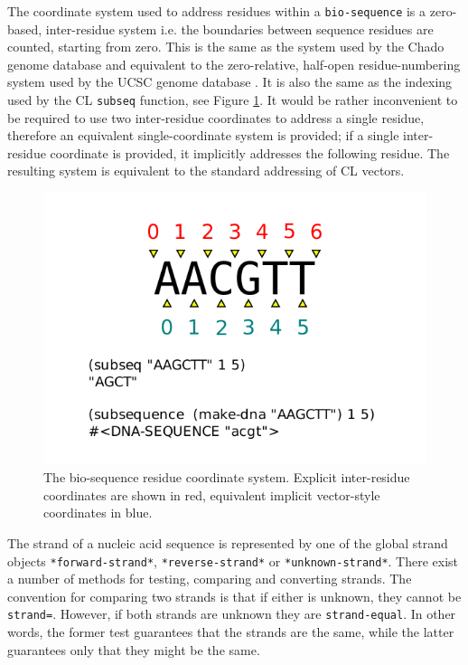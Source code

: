 \documentclass[a4paper, 12pt]{article}
\begin{document}
The coordinate system used to address residues within a
\lstinline!bio-sequence! is a zero-based, inter-residue system
i.e. the boundaries between sequence residues are counted, starting
from zero. This is the same as the system used by the Chado genome
database \cite{gmod-chado} and equivalent to the zero-relative,
half-open residue-numbering system used by the UCSC genome database
\cite{PMID:18996895}. It is also the same as the indexing used by the
CL \lstinline!subseq! function, see Figure
\ref{fig:inter-residue-coords}. It would be rather inconvenient
to be required to use two inter-residue coordinates to address a
single residue, therefore an equivalent single-coordinate system is
provided; if a single inter-residue coordinate is provided, it
implicitly addresses the following residue. The resulting system is
equivalent to the standard addressing of CL vectors.

\begin{figure}[tbph]
  \begin{center}
    \includegraphics[scale=1.0]{inter-residue-coordinates.pdf}
  \end{center}
  \caption{The bio-sequence residue coordinate system. Explicit
    inter-residue coordinates are shown in red, equivalent implicit
    vector-style coordinates in blue.}
  \label{fig:inter-residue-coords}
\end{figure}

The strand of a nucleic acid sequence is represented by one of the
global strand objects \lstinline!*forward-strand*!,
\lstinline!*reverse-strand*! or \lstinline!*unknown-strand*!. There
exist a number of methods for testing, comparing and converting
strands. The convention for comparing two strands is that if either is
unknown, they cannot be \lstinline!strand=!. However, if both strands
are unknown they are \lstinline!strand-equal!. In other words, the
former test guarantees that the strands are the same, while the latter
guarantees only that they might be the same.
\end{document}
